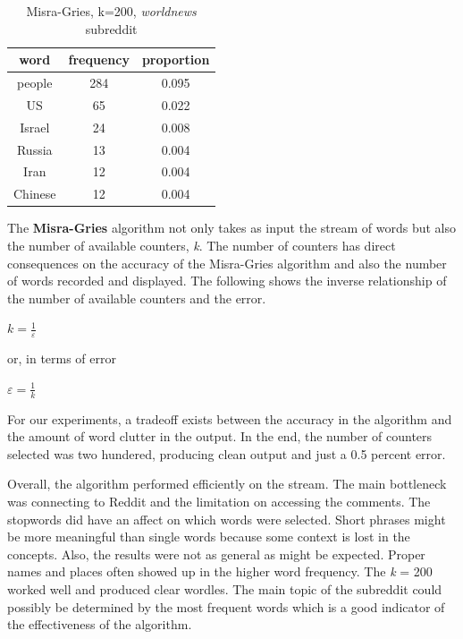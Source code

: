 \documentclass[12pt]{article}
\numberwithin{equation}{section}
\begin{document}
\begin{table}
\centering

\caption{Misra-Gries, k=200, \textit{worldnews} subreddit}
\begin{tabular}{c|c|c}
\hline
\textbf{word} & \textbf{frequency} & \textbf{proportion}\\
\hline
people & 284 & 0.095\\
\hline
US & 65 & 0.022\\
\hline
Israel & 24 & 0.008\\
\hline
Russia & 13 & 0.004\\
\hline
Iran & 12 & 0.004\\
\hline
Chinese & 12 & 0.004\\
\hline
\end{tabular}
\end{table}


The \textbf{Misra-Gries} algorithm not only takes as input the stream of words but also the number of available counters, \textit{k}.  The number of counters has direct consequences on the accuracy of the Misra-Gries algorithm and also the number of words recorded and displayed.  The following shows the inverse relationship of the number of available counters and the error.    

$k=\frac { 1 }{ \varepsilon  } $  

or, in terms of error 

$\varepsilon =\frac { 1 }{ k  } $ 

For our experiments, a tradeoff exists between the accuracy in the algorithm and the amount of word clutter in the output.  In the end, the number of counters selected was two hundered, producing clean output and just a 0.5 percent error.





Overall, the algorithm performed efficiently on the stream.  The main bottleneck was connecting to Reddit and the limitation on accessing the comments.  The stopwords did have an affect on which words were selected.  Short phrases might be more meaningful than single words because some context is lost in the concepts.  Also, the results were not as general as might be expected.  Proper names and places often showed up in the higher word frequency.  The \textit{k} = 200 worked well and produced clear wordles.  The main topic of the subreddit could possibly be determined by the most frequent words which is a good indicator of the effectiveness of the algorithm.   
\end{document}
